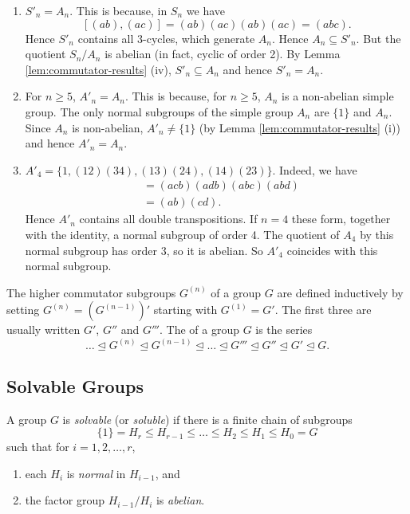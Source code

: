 \begin{examples}
	\begin{enumerate}
		\item $S'_n = A_n$. This is because, in $S_n$ we have
		\[
			[(ab), (ac)] = (ab)(ac)(ab)(ac) = (abc).
		\]
		Hence $S'_n$ contains all 3-cycles, which generate $A_n$. Hence $A_n \subseteq S'_n$. But the quotient $S_n / A_n$ is abelian (in fact, cyclic of order 2). By Lemma \ref{lem:commutator-results} (iv), $S'_n \subseteq A_n$ and hence $S'_n = A_n$.
		\item For $n \geq 5$, $A'_n = A_n$. This is because, for $n \geq 5$, $A_n$ is a non-abelian simple group. The only normal subgroups of the simple group $A_n$ are $\{1\}$ and $A_n$. Since $A_n$ is non-abelian, $A'_n \neq \{1\}$ (by Lemma \ref{lem:commutator-results} (i)) and hence $A'_n = A_n$.
		\item $A'_4 = \{1, (12)(34), (13)(24), (14)(23)\}$. Indeed, we have
		\begin{align*}
			[(abc), (abd)] &= (acb)(adb)(abc)(abd) \\
				&= (ab)(cd).
		\end{align*}
		Hence $A'_n$ contains all double transpositions. If $n = 4$ these form, together with the identity, a normal subgroup of order 4. The quotient of $A_4$ by this normal subgroup has order 3, so it is abelian. So $A'_4$ coincides with this normal subgroup.
	\end{enumerate}
\end{examples}

\begin{definition}
	The higher commutator subgroups $G^{(n)}$ of a group $G$ are defined inductively by setting $G^{(n)} = (G^{(n - 1)})'$ starting with $G^{(1)} = G'$. The first three are usually written $G'$, $G''$ and $G'''$. The  of a group $G$ is the series
\[
	\dots \unlhd G^{(n)} \unlhd G^{(n - 1)} \unlhd \dots \unlhd G''' \unlhd G'' \unlhd G' \unlhd G.
\]
\end{definition}

\subsection{Solvable Groups}
\begin{definition}
	A group $G$ is \emph{solvable} (or \emph{soluble}) if there is a finite chain of subgroups
	\begin{equation}\label{eq:chain-10}
		\{1\} = H_r \leq H_{r - 1} \leq \dots \leq H_2 \leq H_1 \leq H_0 = G
	\end{equation}
	such that for $i = 1, 2, \dots, r$,
	\begin{enumerate}
		\item each $H_i$ is \emph{normal} in $H_{i - 1}$, and
		\item the factor group $H_{i - 1} / H_i$ is \emph{abelian}.
	\end{enumerate}
\end{definition}

